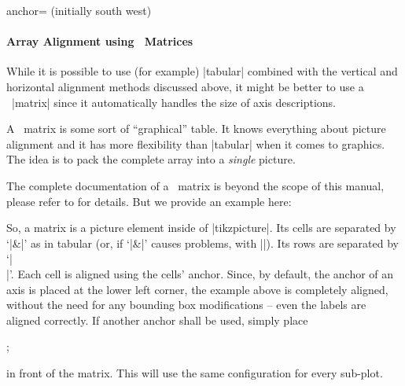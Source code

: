 \begin{pgfplotskey}{anchor= (initially south west)}
\begin{minipage}
\begin{tabular}
\begin{center}
\paragraph{Array Alignment using \Tikz\ Matrices}
While it is possible to use (for example) |tabular| combined with the vertical and horizontal alignment methods discussed above, it might be better to use a \Tikz\ |matrix| since it automatically handles the size of axis descriptions.

A \Tikz\ matrix is some sort of ``graphical'' table. It knows everything about picture alignment and it has more flexibility than |tabular| when it comes to graphics. The idea is to pack the complete array into a \emph{single} picture.

The complete documentation of a \Tikz\ matrix is beyond the scope of this manual, please refer to \cite{tikz} for details. But we provide an example here:
%
\begin{codeexample}[]
\end{codeexample}
\noindent So, a matrix is a picture element inside of |tikzpicture|. Its cells are separated by `|&|' as in tabular (or, if `|&|' causes problems, with |\pgfmatrixnextcell|). Its rows are separated by `|\\|'. Each cell is aligned using the cells' anchor. Since, by default, the anchor of an axis is placed at the lower left corner, the example above is completely aligned, without the need for any bounding box modifications -- even the labels are aligned correctly. If another anchor shall be used, simply place
\begin{codeexample}
\pgfplotsset{anchor=....}
;
\end{codeexample}
\noindent in front of the matrix. This will use the same configuration for every sub-plot.


\end{center}
\end{tabular}
\end{minipage}
\end{pgfplotskey}
